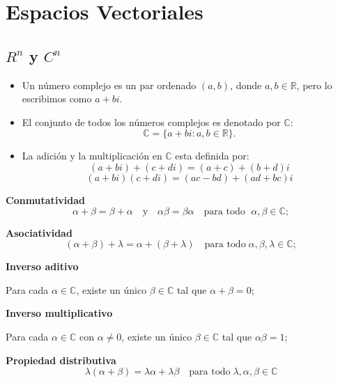 \chapter{Espacios Vectoriales}

\section{\boldmath $R^n$ y $C^n$}

\begin{tcolorbox}[colback=white]
    \begin{def.} \hfill
	\begin{itemize}
	    \item Un número complejo es un par ordenado $(a,b)$, donde $a,b\in \mathbb{R}$, pero lo escribimos como $a+bi$.
	    \item El conjunto de todos los números complejos es denotado por $\mathbb{C}$:
		$$\mathbb{C}=\lbrace a+bi:a,b\in \mathbb{R}\rbrace.$$

	    \item La adición y la multiplicación en $\mathbb{C}$ esta definida por:
		$$(a+bi)+(c+di)=(a+c)+(b+d)i$$
		$$(a+bi)(c+di)=(ac-bd)+(ad+bc)i$$
	\end{itemize}
    \end{def.}
\end{tcolorbox}

\begin{tcolorbox}[title={Propiedades de la aritmética compleja}, colback=white]
	\textbf{Conmutatividad}
	$$\alpha + \beta = \beta + \alpha\quad \mbox{y}\quad \alpha \beta = \beta \alpha \quad \mbox{para todo }\; \alpha,\beta \in \mathbb{C};$$

	\textbf{Asociatividad}
	$$(\alpha + \beta )+\lambda = \alpha + (\beta + \lambda) \quad \mbox{para todo}\; \alpha,\beta,\lambda \in \mathbb{C};$$

	\textbf{Inverso aditivo}
	\begin{center}
	    Para cada $\alpha \in \mathbb{C}$, existe un único $\beta \in \mathbb{C}$ tal que $\alpha + \beta = 0;$
	\end{center}

	\textbf{Inverso multiplicativo}
	\begin{center}
	    Para cada $\alpha \in \mathbb{C}$ con $\alpha \neq 0$, existe un único $\beta \in \mathbb{C}$ tal que $\alpha \beta = 1;$
	\end{center}

	\textbf{Propiedad distributiva}
	$$\lambda (\alpha + \beta) = \lambda \alpha + \lambda \beta \quad \mbox{para todo}\; \lambda, \alpha, \beta \in \mathbb{C}$$
\end{tcolorbox}

